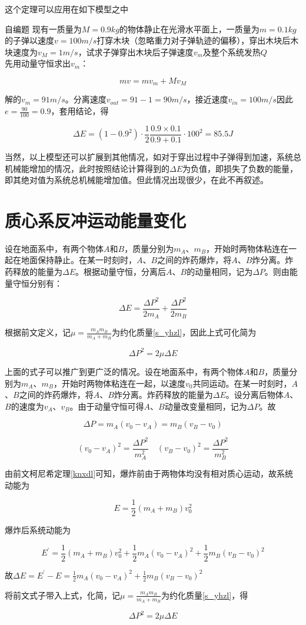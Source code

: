 这个定理可以应用在如下模型之中

\begin{ep}{自编题}{}
现有一质量为$M=0.9kg$的物体静止在光滑水平面上，一质量为$m=0.1kg$的子弹以速度$v=100m/s$打穿木块（忽略重力对子弹轨迹的偏移），穿出木块后木块速度为$v_M = 1m/s$，试求子弹穿出木块后子弹速度$v_m$及整个系统发热$Q$
~\\

先用动量守恒求出$v_m$：

$$m v = m v_m + M v_M$$

解的$v_m = 91m/s$。分离速度$v_{out} =  91 - 1 = 90m/s$，接近速度$v_{in} = 100m/s$因此$e = \frac{90}{100} = 0.9$，套用结论，得

$$\Delta E = (1 - 0.9^2) \cdot \frac{1}{2} \frac{0.9 \times 0.1}{0.9 + 0.1} \cdot 100^2 = 85.5J$$
\end{ep}

当然，以上模型还可以扩展到其他情况，如对于穿出过程中子弹得到加速，系统总机械能增加的情况，此时按照结论计算得到的$\Delta E$为负值，即损失了负数的能量，即其绝对值为系统总机械能增加值。但此情况出现很少，在此不再叙述。

\section{质心系反冲运动能量变化}

设在地面系中，有两个物体$A$和$B$，质量分别为$m_A$、$m_B$，开始时两物体粘连在一起在地面保持静止。在某一时刻时，$A$、$B$之间的炸药爆炸，将$A$、$B$炸分离。炸药释放的能量为$\Delta E$。根据动量守恒，分离后$A$、$B$的动量相同，记为$\Delta P$。则由能量守恒分别有：

$$\Delta E = \frac{\Delta P^2}{2 m_A} + \frac{\Delta P^2}{2 m_B}$$

根据前文定义，记$\mu = \frac{m_A m_B}{m_A + m_B}$为约化质量\eqref{s_yhzl}，因此上式可化简为

$$\Delta P^2 = 2 \mu \Delta E$$

上面的式子可以推广到更广泛的情况。设在地面系中，有两个物体$A$和$B$，质量分别为$m_A$、$m_B$，开始时两物体粘连在一起，以速度$v_0$共同运动。在某一时刻时，$A$、$B$之间的炸药爆炸，将$A$、$B$炸分离。炸药释放的能量为$\Delta E$。设分离后物体$A$、$B$的速度为$v_A$、$v_B$。由于动量守恒可得$A$、$B$动量改变量相同，记为$\Delta P$。故

$$\Delta P = m_A (v_0 - v_A) = m_B (v_B - v_0)$$

$$(v_0 - v_A)^2 = \frac{\Delta P^2}{m_A^2} \quad (v_B - v_0)^2 = \frac{\Delta P^2}{m_B^2}$$

由前文柯尼希定理\eqref{knxdl}可知，爆炸前由于两物体均没有相对质心运动，故系统动能为

$$E = \frac{1}{2} (m_A + m_B) v_0^2$$

爆炸后系统动能为

$$E^{\prime} = \frac{1}{2} (m_A + m_B) v_0^2 + \frac{1}{2} m_A (v_0 - v_A)^2 + \frac{1}{2} m_B (v_B - v_0)^2$$

故$\Delta E = E^{\prime} - E = \frac{1}{2} m_A (v_0 - v_A)^2 + \frac{1}{2} m_B (v_B - v_0)^2$

将前文式子带入上式，化简，记$\mu = \frac{m_A m_B}{m_A + m_B}$为约化质量\eqref{s_yhzl}，得

$$\Delta P^2 = 2 \mu \Delta E$$